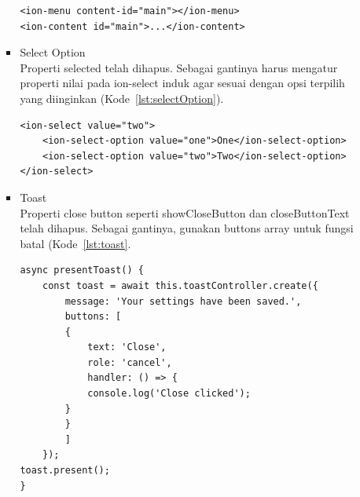 \begin{enumerate}
\begin{itemize}
\begin{itemize}
\begin{lstlisting}[label={lst:menu}, caption=Kode Program untuk Menu]
<ion-menu content-id="main"></ion-menu>
<ion-content id="main">...</ion-content>
\end{lstlisting}
			\item Select Option \\
			Properti selected telah dihapus. Sebagai gantinya harus mengatur properti nilai pada ion-select induk agar sesuai dengan opsi terpilih yang diinginkan (Kode~\ref{lst:selectOption}).
\begin{lstlisting}[label={lst:selectOption}, caption=Kode Program untuk Select Option]
<ion-select value="two">
	<ion-select-option value="one">One</ion-select-option>
	<ion-select-option value="two">Two</ion-select-option>
</ion-select>
\end{lstlisting}
			
			\item Toast \\
			Properti close button seperti showCloseButton dan closeButtonText telah dihapus. Sebagai gantinya, gunakan buttons array untuk fungsi batal (Kode~\ref{lst:toast}.

			
\begin{lstlisting}[label={lst:toast}, caption=Kode Program untuk Toast]
async presentToast() {
	const toast = await this.toastController.create({
		message: 'Your settings have been saved.',
		buttons: [	
		{
			text: 'Close',
			role: 'cancel',
			handler: () => {
			console.log('Close clicked');	
		}
		}
		]
	});
toast.present();
}
\end{lstlisting}
		\end{itemize}


\end{itemize}
\end{enumerate}
